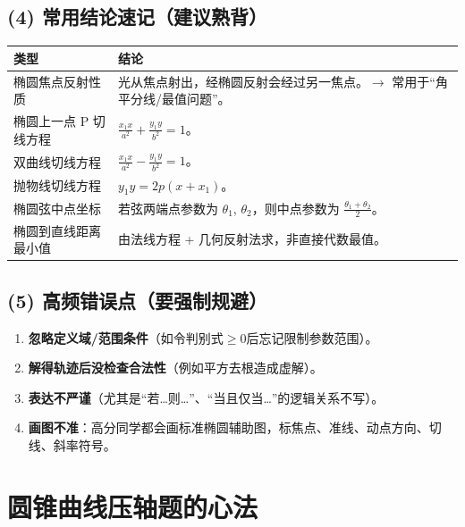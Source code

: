 \documentclass{ctexart}
\begin{document}
	\subsection*{(4) 常用结论速记（建议熟背）}
	
		\begin{table}[ht]
		\centering
		\begin{tabular}{|p{3cm}|p{8cm}|}
			\hline
			\textbf{类型} & \textbf{结论} \\
			\hline
			椭圆焦点反射性质 & 光从焦点射出，经椭圆反射会经过另一焦点。$\rightarrow$ 常用于``角平分线/最值问题''。 \\
			\hline
			椭圆上一点 P 切线方程 & $\frac{x_1x}{a^2} + \frac{y_1y}{b^2} = 1$。 \\
			\hline
			双曲线切线方程 & $\frac{x_1x}{a^2} - \frac{y_1y}{b^2} = 1$。 \\
			\hline
			抛物线切线方程 & $y_1y = 2p(x+x_1)$。 \\
			\hline
			椭圆弦中点坐标 & 若弦两端点参数为 $\theta_1$, $\theta_2$，则中点参数为 $\frac{\theta_1+\theta_2}{2}$。 \\
			\hline
			椭圆到直线距离最小值 & 由法线方程 + 几何反射法求，非直接代数最值。 \\
			\hline
		\end{tabular}
	\end{table}
	
	\subsection*{(5) 高频错误点（要强制规避）}
	
	\begin{enumerate}[label=\arabic*.]
		\item \textbf{忽略定义域/范围条件}（如令判别式$\geq 0$后忘记限制参数范围）。
		\item \textbf{解得轨迹后没检查合法性}（例如平方去根造成虚解）。
		\item \textbf{表达不严谨}（尤其是``若…则…''、``当且仅当…''的逻辑关系不写）。
		\item \textbf{画图不准}：高分同学都会画标准椭圆辅助图，标焦点、准线、动点方向、切线、斜率符号。
	\end{enumerate}
	

	
	\section{圆锥曲线压轴题的心法}
	
	\begin{center}
	\end{center}
	
\end{document}
